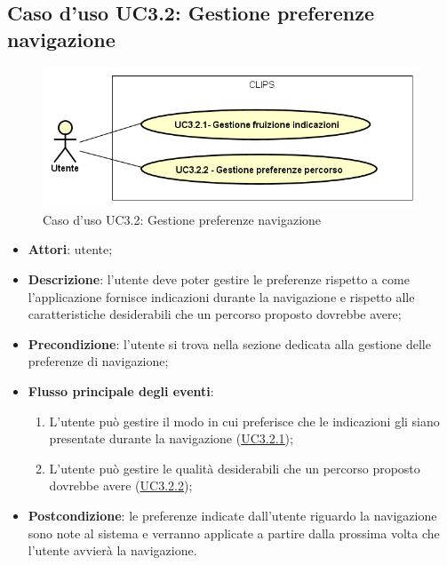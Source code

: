 \documentclass[../AnalisiDeiRequisiti.tex]{subfiles}
\begin{document}
\subsection{Caso d'uso UC3.2: Gestione preferenze navigazione}

        \begin{figure}[H]
            \centering
            \includegraphics[scale=0.95, width=\textwidth]{img/UC3-2.png}
            \caption{Caso d'uso UC3.2: Gestione preferenze navigazione}\label{fig:UC3.2} 
        \end{figure}
\begin{itemize}
\item \textbf{Attori}: utente;
\item \textbf{Descrizione}: l'utente deve poter gestire le preferenze rispetto a come l'applicazione fornisce indicazioni durante la navigazione e rispetto alle caratteristiche desiderabili che un percorso proposto dovrebbe avere; 
      \item \textbf{Precondizione}: l'utente si trova nella sezione dedicata alla gestione delle preferenze di navigazione;

        \item \textbf{Flusso principale degli eventi}:
          \begin{enumerate}
          \item L'utente può gestire il modo in cui preferisce che le indicazioni gli siano presentate durante la navigazione (\hyperlink{UC3.2.1}{UC3.2.1});
          \item L'utente può gestire le qualità desiderabili che un percorso proposto dovrebbe avere (\hyperlink{UC3.2.2}{UC3.2.2});

      \end{enumerate}
    \item \textbf{Postcondizione}: le preferenze indicate dall'utente riguardo la navigazione sono note al sistema e verranno applicate a partire dalla prossima volta che l'utente avvierà la navigazione.
  \end{itemize}
\hypertarget{UC3.2.1}{}
\end{document}
